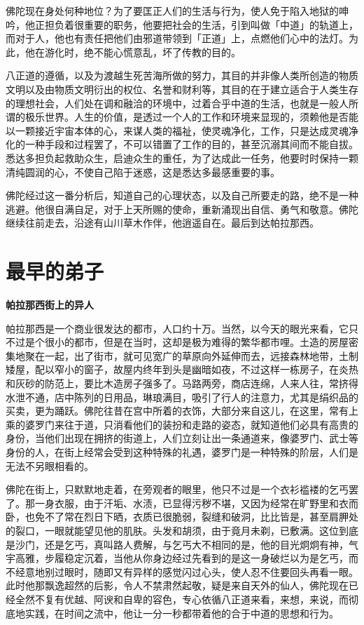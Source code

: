 \documentclass[twoside,openany]{book}
\newcommand{\mt}[1]{\textbullet \textbf{#1}}
\begin{document}
佛陀现在身处何种地位？为了要匡正人们的生活与行为，使人免于陷入地狱的呻吟，他正担负着很重要的职务，他要把社会的生活，引到叫做「中道」的轨道上，而对于人，他也有责任把他们由邪道带领到「正道」上，点燃他们心中的法灯。为此，他在游化时，绝不能心慌意乱，坏了传教的目的。

八正道的遵循，以及为渡越生死苦海所做的努力，其目的并非像人类所创造的物质文明以及由物质文明衍出的权位、名誉和财利等，其目的在于建立适合于人类生存的理想社会，人们处在调和融洽的环境中，过着合乎中道的生活，也就是一般人所谓的极乐世界。人生的价值，是透过一个人的工作和环境来显现的，须赖他是否能以一颗接近宇宙本体的心，来谋人类的福祉，使灵魂净化，工作，只是达成灵魂净化的一种手段和过程罢了，不可以错置了工作的目的，甚至沉溺其间而不能自拔。悉达多担负起救助众生，启迪众生的重任，为了达成此一任务，他要时时保持一颗清纯圆润的心，不使自己陷于迷惑，这是悉达多最感重要的事。

佛陀经过这一番分析后，知道自己的心理状态，以及自己所要走的路，绝不是一种逃避。他很自满自足，对于上天所赐的使命，重新涌现出自信、勇气和敬意。佛陀继续往前走去，沿途有山川草木作伴，他逍遥自在。最后到达帕拉那西。

\section{最早的弟子}\label{sec2.4}

\mt{帕拉那西街上的异人}

帕拉那西是一个商业很发达的都市，人口约十万。当然，以今天的眼光来看，它只不过是个很小的都市，但是在当时，这却是极为难得的繁华都市哩。土造的房屋密集地聚在一起，出了街市，就可见宽广的草原向外延伸而去，远接森林地带，土制矮屋，配以窄小的窗子，故屋内终年到头是幽暗如夜，不过这样一栋房子，在炎热和灰砂的防范上，要比木造房子强多了。马路两旁，商店连绵，人来人往，常挤得水泄不通，店中陈列的日用品，琳琅满目，吸引了行人的注意力，尤其是绢织品的买卖，更为踊跃。佛陀往昔在宫中所着的衣饰，大部分来自这儿，在这里，常有上乘的婆罗门来往于道，只消看他们的装扮和走路的姿态，就知道他们必具有高贵的身份，当他们出现在拥挤的街道上，人们立刻让出一条通道来，像婆罗门、武士等身份的人，在街上经常会受到这种特殊的礼遇，婆罗门是一种特殊的阶层，人们是无法不另眼相看的。

佛陀在街上，只默默地走着，在旁观者的眼里，他只不过是一个衣衫褴褛的乞丐罢了。那一身衣服，由于汗垢、水渍，已显得污秽不堪，又因为经常在旷野里和衣而卧，也免不了常在烈日下晒，衣质已很脆弱，裂缝和破洞，比比皆是，甚至肩胛处的裂口，一眼就能望见他的肌肤。头发和胡须，由于竟月未剃，已敷满。这位到底是沙门，还是乞丐，真叫路人费解，与乞丐大不相同的是，他的目光炯炯有神，气宇高雅，步履稳定沉着，当他从你身边经过先看到的是这一身破烂以为是乞丐，而不经意地别过眼时，随即又有异样的感觉闪过心头，使人忍不住要回头再看一眼。此时他那飘逸超然的后影，令人不禁肃然起敬，疑是来自天外的仙人，佛陀现在已经全然不复有优越、阿谀和自卑的容色，专心依循八正道来看，来想，来说，而彻底地实践，在时间之流中，他让一分一秒都带着他的合于中道的思想和行为。
\end{document}
